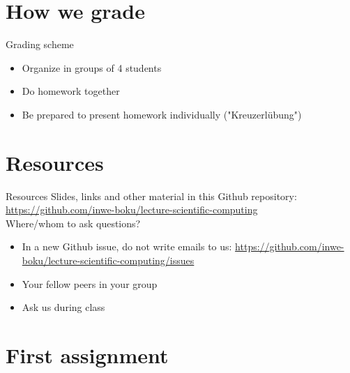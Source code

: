\section{How we grade}

\begin{frame}{Grading scheme}

	\begin{itemize}
		\item Organize in groups of 4 students
		\item Do homework together
		\item Be prepared to present homework individually ("Kreuzerlübung")
	\end{itemize}

\end{frame}

\section{Resources}

\begin{frame}[fragile]{Resources}
    Slides, links and other material in this Github repository:
    \href{https://github.com/inwe-boku/lecture-scientific-computing}{https://github.com/inwe-boku/lecture-scientific-computing}\\
    \bigskip
    \pause
    Where/whom to ask questions?
	\begin{itemize}
        \item In a new Github issue, do not write emails to us:
            \href{https://github.com/inwe-boku/lecture-scientific-computing/issues}{https://github.com/inwe-boku/lecture-scientific-computing/issues}
		\item Your fellow peers in your group
		\item Ask us during class
	\end{itemize}
\end{frame}

\section{First assignment}

